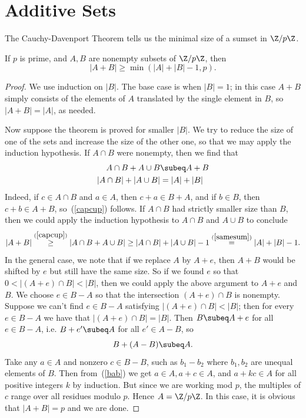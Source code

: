 \section{Additive Sets}
The Cauchy-Davenport Theorem tells us the minimal size of a sumset in $\Z/p\Z$.
\begin{thm}\label{cauchy-davenport}
If $p$ is prime, and $A,B$ are nonempty subsets of $\Z/p\Z$, then
\[
|A+B|\geq \min(|A|+|B|-1,p).
\]
\end{thm}
\begin{proof}
We use induction on $|B|$. The base case is when $|B|=1$; in this case $A+B$ simply consists of the elements of $A$ translated by the single element in $B$, so $|A+B|=|A|$, as needed.

Now suppose the theorem is proved for smaller $|B|$. We try to reduce the size of one of the sets and increase the size of the other one, so that we may apply the induction hypothesis. 
If $A\cap B$ were nonempty, then we find that
\begin{align}
\label{capcup}
A\cap B+A\cup B&\subeq A+B\\
\label{samesum}
|A\cap B|+|A\cup B|&=|A|+|B|
\end{align}
Indeed, if $c\in A\cap B$ and $a\in A$, then $c+a\in B+A$, and if $b\in B$, then $c+b\in A+B$, so~(\ref{capcup}) follows. If $A\cap B$ had strictly smaller size than $B$, then we could apply the induction hypothesis to $A\cap B$ and $A\cup B$ to conclude\vspace{-.1cm}
\[
|A+B|\stackrel{(\ref{capcup})}{\geq}|A\cap B+A\cup B|\geq |A\cap B|+|A\cup B|-1\stackrel{(\ref{samesum})}{=}|A|+|B|-1.
\]
In the general case, we note that if we replace $A$ by $A+e$, then $A+B$ would be shifted by $e$ but still have the same size. So if we found $e$ so that $0<|(A+e)\cap B|<|B|$, then we could apply the above argument to $A+e$ and $B$. We choose $e\in B-A$ so that the intersection $(A+e)\cap B$ is nonempty. Suppose we can't find $e\in B-A$ satisfying $|(A+e)\cap B|<|B|$; then for every $e\in B-A$ we have that $|(A+e)\cap B|=|B|$. Then $B\subeq A+e$ for all $e\in B-A$, i.e. $B+e'\subeq A$ for all $e'\in A-B$, so 
\begin{equation}B+(A-B)\subeq A.\label{bab}
\end{equation}
 Take any $a\in A$ and nonzero $c\in B-B$, such as $b_1-b_2$ where $b_1,b_2$ are unequal elements of $B$. Then from~(\ref{bab}) we get $a\in A, a+c\in A$, and $a+kc\in A$ for all positive integers $k$ by induction. But since we are working mod $p$, the multiples of $c$ range over all residues modulo $p$. Hence $A=\Z/p\Z$. In this case, it is obvious that $|A+B|=p$ and we are done.
\end{proof}
